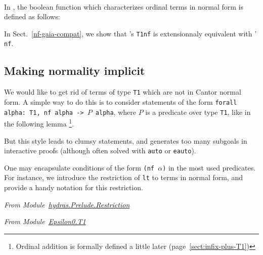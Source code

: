 \label{Predicates:nf-T1}








\paragraph*{\gaiasign}
In \gaia, the boolean function which characterizes ordinal terms in normal form is defined as follows:


In Sect.~\vref{nf-gaia-compat}, we show that \gaia's \texttt{T1nf} is extensionnaly equivalent with \HydrasLib'  \texttt{nf}.



\subsection{Making normality implicit}
  We would like to get rid of terms of type \texttt{T1} which are not in Cantor normal form.
A simple way to do this is to consider statements of the form 
\texttt{forall alpha: T1, nf alpha -> $P$ alpha}, where $P$ is a predicate over type \texttt{T1}, like in the following lemma \footnote{Ordinal addition is formally defined a little later (page~\ref{sect:infix-plus-T1})}.



\vspace{4pt}


But this style leads to clumsy statements, and generates too many subgoals in interactive proofs (although often solved with \texttt{auto} or \texttt{eauto}).

One may encapsulate conditions of the form \texttt{(nf $\alpha$)} in
the most used predicates. For instance, we introduce the restriction of \texttt{lt} to terms in normal form, and provide a handy notation for this restriction.

\vspace{4pt}
\emph{From Module~\href{../theories/html/hydras.Prelude.Restriction.html}{hydras.Prelude.Restriction}}



\vspace{4pt}
\emph{From Module~\href{../theories/html/hydras.Epsilon0.T1.html\#LT}{Epsilon0.T1}}

